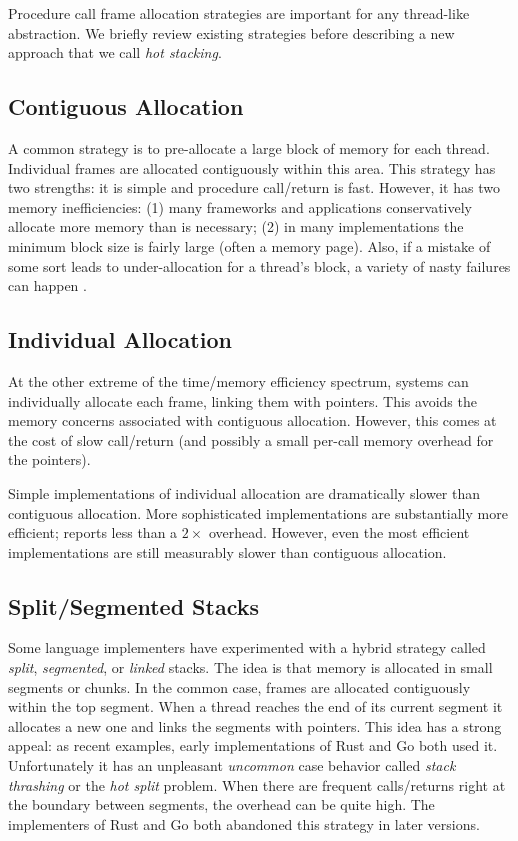 \documentclass[a4paper,UKenglish,cleveref, autoref]{lipics-v2019}
\begin{document}
Procedure call frame allocation strategies are important for any thread-like abstraction.
We briefly review existing strategies before describing a new approach that we call \emph{hot stacking}.

\subsection{Contiguous Allocation}

A common strategy is to pre-allocate a large block of memory for each thread.
Individual frames are allocated contiguously within this area.
This strategy has two strengths: it is simple and procedure call{\slash}return is fast.
However, it has two memory inefficiencies: (1) many frameworks and applications conservatively allocate more memory than is necessary; (2) in many implementations the minimum block size is fairly large (often a memory page).
Also, if a mistake of some sort leads to under-allocation for a thread's block, a variety of nasty failures can happen \cite{Spolsky2008}.

\subsection{Individual Allocation}

At the other extreme of the time{\slash}memory efficiency spectrum, systems can individually allocate each frame, linking them with pointers.
This avoids the memory concerns associated with contiguous allocation.
However, this comes at the cost of slow call{\slash}return (and possibly a small per-call memory overhead for the pointers).

Simple implementations of individual allocation are dramatically slower than contiguous allocation.
More sophisticated implementations are substantially more efficient; \cite{Shao2000} reports less than a $2\times$ overhead.
However, even the most efficient implementations are still measurably slower than contiguous allocation.

\subsection{Split{\slash}Segmented Stacks}

Some language implementers have experimented with a hybrid strategy called \emph{split}, \emph{segmented}, or \emph{linked} stacks.
The idea is that memory is allocated in small segments or chunks.
In the common case, frames are allocated contiguously within the top segment.
When a thread reaches the end of its current segment it allocates a new one and links the segments with pointers.
This idea has a strong appeal: as recent examples, early implementations of Rust and Go both used it.
Unfortunately it has an unpleasant \emph{uncommon} case behavior called \emph{stack thrashing} or the \emph{hot split} problem.
When there are frequent calls{\slash}returns right at the boundary between segments, the overhead can be quite high.
The implementers of Rust \cite{Anderson2013} and Go \cite{Anastasopoulos2014} both abandoned this strategy in later versions.
\end{document}
